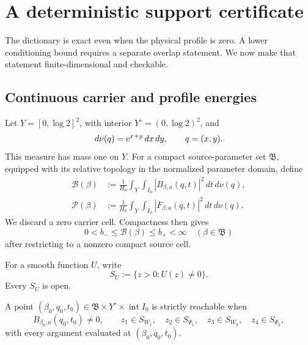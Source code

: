 \section{A deterministic support certificate}
\label{sec:tpc53-support}

The dictionary is exact even when the physical profile is zero.  A
lower conditioning bound requires a separate overlap statement.  We now
make that statement finite-dimensional and checkable.

\subsection{Continuous carrier and profile energies}

Let \(Y=[0,\log2]^2\), with interior \(Y^\circ=(0,\log2)^2\), and
\begin{equation}
 d\nu(q)=\mathrm e^{x+y}\,dx\,dy,
 \qquad q=(x,y).
 \label{eq:tpc53-row-limit-measure}
\end{equation}
This measure has mass one on \(Y\).  For a compact source-parameter set
\(\mathfrak B\), equipped with its relative topology in the normalized
parameter domain, define
\begin{align}
 \mathscr B(\beta)
 &:=\frac1{H_0}\int_Y\int_{I_0}
  |B_{\beta,a}(q,t)|^2\,dt\,d\nu(q),
 \label{eq:tpc53-continuous-carrier-energy}\\
 \mathscr P(\beta)
 &:=\frac1{H_0}\int_Y\int_{I_0}
  |F_{\beta,a}(q,t)|^2\,dt\,d\nu(q).
 \label{eq:tpc53-continuous-profile-energy}
\end{align}
We discard a zero carrier cell.  Compactness then gives
\begin{equation}
 0<b_-\le\mathscr B(\beta)\le b_+<\infty
 \quad(\beta\in\mathfrak B)
 \label{eq:tpc53-carrier-bounds}
\end{equation}
after restricting to a nonzero compact source cell.

For a smooth function \(U\), write
\begin{equation}
 S_U:=\{z>0:U(z)\ne0\}.
 \label{eq:tpc53-nonzero-set}
\end{equation}
Every \(S_U\) is open.

\begin{definition}
\label{def:tpc53-strict-point}
A point \((\beta_0,q_0,t_0)\in
\mathfrak B\times Y^\circ\times\operatorname{int}I_0\)
is strictly reachable when
\begin{equation}
 B_{\beta_0,a}(q_0,t_0)\ne0,
 \qquad
 z_1\in S_{W_1},\quad z_2\in S_{\Psi_1},\quad
 z_3\in S_{W_2},\quad z_4\in S_{\Psi_2},
 \label{eq:tpc53-strict-reachability}
\end{equation}
with every argument evaluated at \((\beta_0,q_0,t_0)\).
\end{definition}

